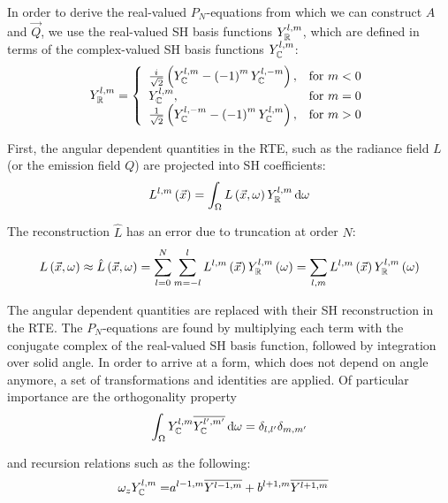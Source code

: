 In order to derive the real-valued $P_N$-equations from which we can construct $A$ and $\vec{Q}$, we use the real-valued SH basis functions $Y_{\mathbb{R}}^{l,m}$, which are defined in terms of the complex-valued SH basis functions $Y_{\mathbb{C}}^{l,m}$:
\begin{align}
Y_{\mathbb{R}}^{l,m}=
\left\{
\begin{array}{lr}
\frac{{i\mkern1mu}}{\sqrt{2}}\left(Y_{\mathbb{C}}^{l,m}-\left(-1\right)^mY_{\mathbb{C}}^{l,-m}\right), & \text{for } m < 0\\
Y_{\mathbb{C}}^{l,m}, & \text{for } m = 0\\
\frac{1}{\sqrt{2}}\left(Y_{\mathbb{C}}^{l,-m}-\left(-1\right)^mY_{\mathbb{C}}^{l,m}\right), & \text{for } m > 0
\end{array}
\right.
\end{align}

First, the angular dependent quantities in the RTE, such as the radiance field $L$ (or the emission field $Q$) are projected into SH coefficients:
\begin{align}
L^{l,m}\left(\vec{x}\right)
=
\int_\Omega{L\left(\vec{x}, \omega\right)Y_{\mathbb{R}}^{l,m}\,\mathrm{d}\omega}
\end{align}

The reconstruction $\hat{L}$ has an error due to truncation at order $N$:
\begin{align}
L\left(\vec{x}, \omega\right)
\approx
\hat{L}\left(\vec{x}, \omega\right) =
\sum_{l=0}^{N}
{
\sum_{m=-l}^{l}
{
L^{l,m}\left(\vec{x}\right)Y_{\mathbb{R}}^{l,m}\left(\omega\right)
}
}
=
\sum_{l,m}
{
L^{l,m}\left(\vec{x}\right)Y_{\mathbb{R}}^{l,m}\left(\omega\right)
}
\end{align}

The angular dependent quantities are replaced with their SH reconstruction in the RTE. The $P_N$-equations are found by multiplying each term with the conjugate complex of the real-valued SH basis function, followed by integration over solid angle. In order to arrive at a form, which does not depend on angle anymore, a set of transformations and identities are applied. Of particular importance are the orthogonality property
\begin{align}
\int_{\Omega}{ Y_{\mathbb{C}}^{l,m}\overline{Y_{\mathbb{C}}^{l',m'}}\,\mathrm{d}\omega} = \delta_{l,l'}\delta_{m,m'}
\end{align}

and recursion relations such as the following:
\begin{align}
\omega_zY_{\mathbb{C}}^{l, m}=
&
a^{{l-1,m}}\overline{Y^{l-1, m}}+b^{{l+1,m}}\overline{Y^{l+1, m}}
\end{align}

